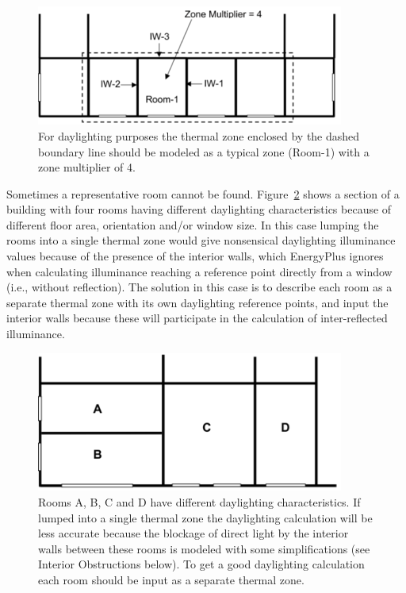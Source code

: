 \begin{figure}[hbtp] %
\centering
\includegraphics[width=0.9\textwidth, height=0.9\textheight, keepaspectratio=true]{media/image098.png}
\caption{For daylighting purposes the thermal zone enclosed by the dashed boundary line should be modeled as a typical zone (Room-1) with a zone multiplier of 4. \protect \label{fig:for-daylighting-purposes-the-thermal-zone}}
\end{figure}

Sometimes a representative room cannot be found. Figure~\ref{fig:rooms-a-b-c-and-d-have-different-daylighting} shows a section of a building with four rooms having different daylighting characteristics because of different floor area, orientation and/or window size. In this case lumping the rooms into a single thermal zone would give nonsensical daylighting illuminance values because of the presence of the interior walls, which EnergyPlus ignores when calculating illuminance reaching a reference point directly from a window (i.e., without reflection). The solution in this case is to describe each room as a separate thermal zone with its own daylighting reference points, and input the interior walls because these will participate in the calculation of inter-reflected illuminance.

\begin{figure}[hbtp] %
\centering
\includegraphics[width=0.9\textwidth, height=0.9\textheight, keepaspectratio=true]{media/image099.png}
\caption{Rooms A, B, C and D have different daylighting characteristics. If lumped into a single thermal zone the daylighting calculation will be less accurate because the blockage of direct light by the interior walls between these rooms is modeled with some simplifications (see Interior Obstructions below). To get a good daylighting calculation each room should be input as a separate thermal zone. \protect \label{fig:rooms-a-b-c-and-d-have-different-daylighting}}
\end{figure}

